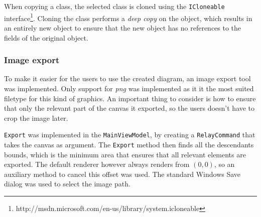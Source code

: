 When copying a class, the selected class is cloned using the 
\texttt{ICloneable} 
interface\footnote{http://msdn.microsoft.com/en-us/library/system.icloneable}. 
Cloning the class performs a \emph{deep copy} on 
the object, which results in an entirely new object to ensure that the new 
object has no references to the fields of the original object.

\subsubsection{Image export}

To make it easier for the users to use the created diagram, an image export tool
was implemented. Only support for \textit{png} was implemented as it it
the most suited filetype for this kind of graphics. An important thing to consider
is how to ensure that only the relevant part of the canvas it exported, so
the users doesn't have to crop the image later.

\texttt{Export} was implemented in the \texttt{MainViewModel}, by creating a
\texttt{RelayCommand} that takes the canvas as argument.
The \texttt{Export} method then finds all the  descendants bounds, which is 
the minimum area that ensures that all relevant elements are exported. The
default renderer however always renders from $(0,0)$, so an auxiliary method to
cancel this offset was used. The standard Windows Save dialog was used to
select the image path.

